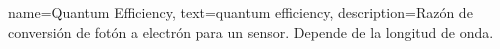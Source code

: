 \usepackage[sort=none,abbreviations]{glossaries-extra}



{
	name=Quantum Efficiency,
	text=quantum efficiency,
	description={Razón de conversión de fotón a electrón para un sensor. Depende de la longitud de onda.}
}


